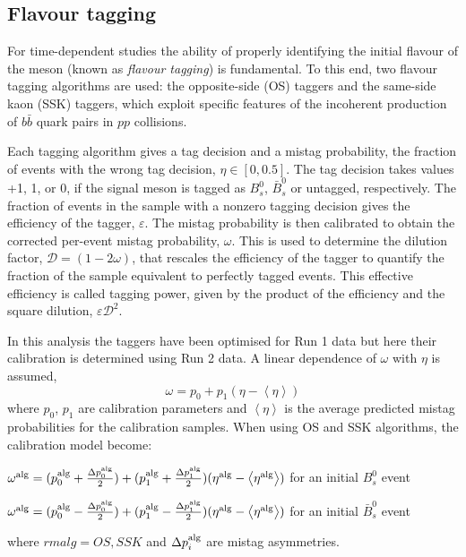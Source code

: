 \subsection{Flavour tagging}
\label{subsec:Tagging}
For time-dependent studies the ability of properly identifying the initial flavour of the meson (known as \textit{flavour tagging}) is fundamental. To this end, two flavour tagging algorithms are used: the opposite-side (OS) taggers and the same-side kaon (SSK) taggers, which exploit specific features of the incoherent production of $b\bar{b}$ quark pairs in $pp$ collisions.

Each tagging algorithm gives a tag decision and a mistag probability, the fraction of events with the wrong tag decision, $\eta \in [0, 0.5]$. The tag decision takes values +1, 1, or 0, if the signal meson is tagged as $B_s^0$, $\bar{B}_s^0$ or untagged, respectively. The fraction of events in the sample with a nonzero tagging decision gives
the efficiency of the tagger, $\varepsilon$. The mistag probability is then calibrated to obtain the corrected per-event mistag probability, $\omega$. This is used to determine the dilution factor, $\mathcal{D} = (1 − 2\omega)$, that rescales the efficiency of the tagger to quantify the fraction of the sample equivalent to perfectly tagged events. This effective efficiency is called tagging power, given by the product of the efficiency and the square dilution, $\varepsilon\mathcal{D}^2$.

In this analysis the taggers have been optimised for Run 1 data but here their
calibration is determined using Run 2 data.  A linear dependence of $\omega$ with $\eta$ is assumed, 
\begin{equation}
\omega = p_0 + p_1(\eta - \left \langle \eta \right \rangle)
\end{equation}
where $p_0$, $p_1$ are calibration parameters and $\left \langle \eta \right \rangle$ is the average predicted mistag probabilities for the calibration samples. When using OS and SSK algorithms, the calibration model become:
\\
\begin{center}
$\omega^{\rm alg} = (p_0^{\rm alg} + \frac{\Delta p_0^{\rm alg}}{2}) + (p_1^{\rm alg} + \frac{\Delta p_1^{\rm alg}}{2})(\eta^{\rm alg} - \left \langle \eta^{\rm alg} \right \rangle)$ for an initial $B_s^0$ event 
\end{center}
\begin{center}
$\omega^{\rm alg} = (p_0^{\rm alg} - \frac{\Delta p_0^{\rm alg}}{2}) + (p_1^{\rm alg} - \frac{\Delta p_1^{\rm alg}}{2})(\eta^{\rm alg} - \left \langle \eta^{\rm alg} \right \rangle)$ for an initial $\bar{B}_s^0$ event 
\end{center}
where $rm alg = OS, SSK$ and $\Delta p_i^{\rm alg}$ are mistag asymmetries. 

